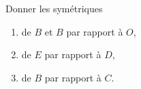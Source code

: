 
\begin{exercice}\label{exosmath-0988}

    Donner les symétriques
    \begin{enumerate}
        \item
            de \( B \) et \( B\) par rapport à \( O\),
        \item
            de \( E\) par rapport à \( D\),
        \item
            de \( B\) par rapport à \( C\).
    \end{enumerate}

\begin{center}
   
\end{center}

\end{exercice}
